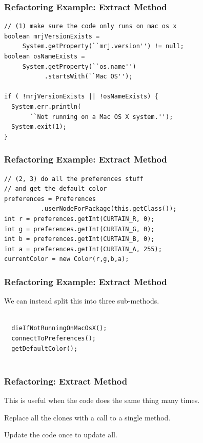 \begin{frame}[fragile]
\frametitle{Refactoring Example: Extract Method}
\begin{changemargin}{1cm}

\begin{verbatim}
// (1) make sure the code only runs on mac os x
boolean mrjVersionExists = 
     System.getProperty(``mrj.version'') != null;
boolean osNameExists = 
     System.getProperty(``os.name'')
           .startsWith(``Mac OS'');

if ( !mrjVersionExists || !osNameExists) {
  System.err.println(
       ``Not running on a Mac OS X system.'');
  System.exit(1);
}
\end{verbatim}
\end{changemargin}
\end{frame}

\begin{frame}[fragile]
\frametitle{Refactoring Example: Extract Method}
\begin{changemargin}{1cm}

\begin{verbatim}
// (2, 3) do all the preferences stuff
// and get the default color
preferences = Preferences
          .userNodeForPackage(this.getClass());
int r = preferences.getInt(CURTAIN_R, 0);
int g = preferences.getInt(CURTAIN_G, 0);
int b = preferences.getInt(CURTAIN_B, 0);
int a = preferences.getInt(CURTAIN_A, 255);
currentColor = new Color(r,g,b,a);
\end{verbatim}



\end{changemargin}
\end{frame}


\begin{frame}[fragile]
\frametitle{Refactoring Example: Extract Method}
\begin{changemargin}{1cm}

We can instead split this into three sub-methods.

\begin{verbatim}

  dieIfNotRunningOnMacOsX();
  connectToPreferences();
  getDefaultColor();


\end{verbatim}
\end{changemargin}
\end{frame}

\begin{frame}
\frametitle{Refactoring: Extract Method}
\begin{changemargin}{1cm}

This is useful when the code does the same thing many times.

Replace all the clones with a call to a single method.

Update the code once to update all.

\end{changemargin}
\end{frame}

